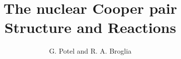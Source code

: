\documentclass[a4paper,11pt]{book}
\title{The nuclear Cooper pair\\\large Structure and Reactions}
\author{G. Potel and R. A. Broglia}
\numberwithin{equation}{section}
\numberwithin{figure}{section}
\numberwithin{table}{section}
\begin{document}
\maketitle
% 

%
\tableofcontents
\setcounter{chapter}{0}








\renewcommand{\bibname}{Bibliography}

\printindex
\end{document}
